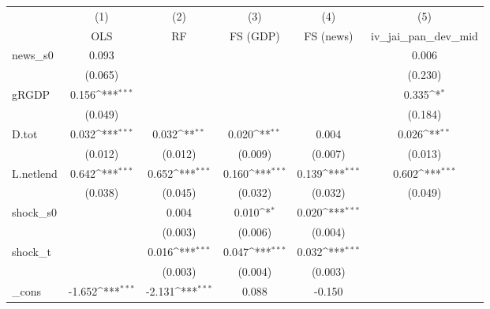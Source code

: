 {
\def\sym#1{\ifmmode^{#1}\else\(^{#1}\)\fi}
\begin{tabular}{l*{5}{c}}
\toprule
            &\multicolumn{1}{c}{(1)}&\multicolumn{1}{c}{(2)}&\multicolumn{1}{c}{(3)}&\multicolumn{1}{c}{(4)}&\multicolumn{1}{c}{(5)}\\
            &\multicolumn{1}{c}{OLS}&\multicolumn{1}{c}{RF}&\multicolumn{1}{c}{FS (GDP)}&\multicolumn{1}{c}{FS (news)}&\multicolumn{1}{c}{iv\_jai\_pan\_dev\_mid}\\
\midrule
news\_s0     &       0.093         &                     &                     &                     &       0.006         \\
            &     (0.065)         &                     &                     &                     &     (0.230)         \\
\addlinespace
gRGDP       &       0.156\sym{***}&                     &                     &                     &       0.335\sym{*}  \\
            &     (0.049)         &                     &                     &                     &     (0.184)         \\
\addlinespace
D.tot       &       0.032\sym{***}&       0.032\sym{**} &       0.020\sym{**} &       0.004         &       0.026\sym{**} \\
            &     (0.012)         &     (0.012)         &     (0.009)         &     (0.007)         &     (0.013)         \\
\addlinespace
L.netlend   &       0.642\sym{***}&       0.652\sym{***}&       0.160\sym{***}&       0.139\sym{***}&       0.602\sym{***}\\
            &     (0.038)         &     (0.045)         &     (0.032)         &     (0.032)         &     (0.049)         \\
\addlinespace
shock\_s0    &                     &       0.004         &       0.010\sym{*}  &       0.020\sym{***}&                     \\
            &                     &     (0.003)         &     (0.006)         &     (0.004)         &                     \\
\addlinespace
shock\_t     &                     &       0.016\sym{***}&       0.047\sym{***}&       0.032\sym{***}&                     \\
            &                     &     (0.003)         &     (0.004)         &     (0.003)         &                     \\
\addlinespace
\_cons      &      -1.652\sym{***}&      -2.131\sym{***}&       0.088         &      -0.150         &                     \\

\end{tabular}}
